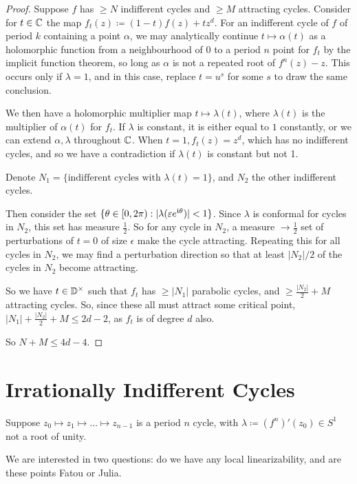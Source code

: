 \documentclass[10pt,a4paper]{article}
\begin{document}
\begin{proof}
  Suppose $f$ has $\geq N$ indifferent cycles and $\geq M$ attracting cycles. Consider for $t \in \mathbb{C}$ the map $f_t(z) \coloneqq (1-t)f(z)+tz^d$. For an indifferent cycle of $f$ of period $k$ containing a point $\alpha$, we may analytically continue $t \mapsto \alpha(t)$ as a holomorphic function from a neighbourhood of 0 to a period $n$ point for $f_t$ by the implicit function theorem, so long as $\alpha$ is not a repeated root of $f^n(z)-z$. This occurs only if $\lambda = 1$, and in this case, replace $t = u^s$ for some $s$ to draw the same conclusion.

  We then have a holomorphic multiplier map $t \mapsto \lambda(t)$, where $\lambda(t)$ is the multiplier of $\alpha(t)$ for $f_t$. If $\lambda$ is constant, it is either equal to $1$ constantly, or we can extend $\alpha, \lambda$ throughout $\mathbb{C}$. When $t = 1, f_t(z) = z^d$, which has no indifferent cycles, and so we have a contradiction if $\lambda(t)$ is constant but not 1.

  Denote $N_1 = \{\text{indifferent cycles with } \lambda(t) = 1\}$, and $N_2$ the other indifferent cycles.

  Then consider the set $\{\theta \in [0, 2\pi) : |\lambda(\varepsilon e^{\mathfrak{i} \theta})| < 1\}$. Since $\lambda$ is conformal for cycles in $N_2$, this set has measure $\frac12$. So for any cycle in $N_2$, a measure $\to\frac12$ set of perturbations of $t=0$ of size $\epsilon$ make the cycle attracting. Repeating this for all cycles in $N_2$, we may find a perturbation direction so that at least $|N_2|/2$ of the cycles in $N_2$ become attracting.

  So we have $t \in \mathbb{D}^\times$ such that $f_t$ has $\geq |N_1|$ parabolic cycles, and $\geq \frac{|N_2|}{2}+M$ attracting cycles. So, since these all must attract some critical point, $|N_1|+\frac{|N_2|}{2}+M \leq 2d-2$, as $f_t$ is of degree $d$ also.

  So $N+M \leq 4d-4$.
\end{proof}
\section{Irrationally Indifferent Cycles}
Suppose $z_0 \mapsto z_1 \mapsto \ldots \mapsto z_{n-1}$ is a period $n$ cycle, with $\lambda \coloneqq (f^n)'(z_0) \in S^1$ not a root of unity.

We are interested in two questions: do we have any local linearizability, and are these points Fatou or Julia.
\end{document}
